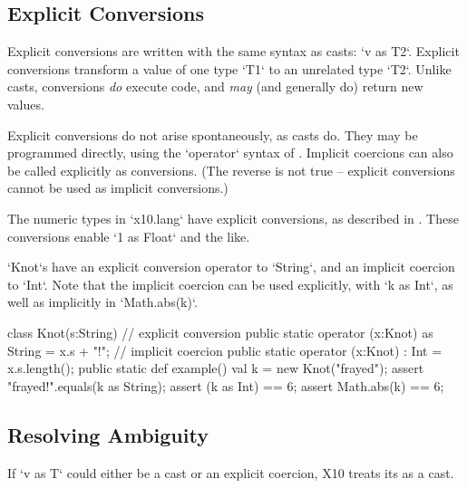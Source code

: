 \subsection{Explicit Conversions}

Explicit conversions are written with the same syntax as casts: \xcd`v as T2`.  
Explicit conversions transform a value of one type \xcd`T1` to an unrelated
type \xcd`T2`.  Unlike casts, conversions {\em do} execute code, and {\em may}
(and generally do) return new values.  

Explicit conversions do not arise spontaneously, as casts do. They may be
programmed directly, using the \xcd`operator` syntax of .  
Implicit coercions can also be called explicitly as conversions.  (The reverse
is not true -- explicit conversions cannot be used as implicit conversions.) 

The numeric types in \xcd`x10.lang` have explicit conversions, as described in
.  These conversions enable 
\xcd`1 as Float` and the like.  

\begin{ex}
\xcd`Knot`s have an explicit conversion operator to \xcd`String`, and an
implicit coercion to \xcd`Int`.  Note that the implicit coercion can be used
explicitly, with \xcd`k as Int`, as well as implicitly in \xcd`Math.abs(k)`. 
\begin{xten}
class Knot(s:String) { 
  // explicit conversion
  public static operator (x:Knot) as String = x.s + "!";
  // implicit coercion
  public static operator (x:Knot) : Int = x.s.length();
  public static def example() {
     val k = new Knot("frayed");
     assert "frayed!".equals(k as String);
     assert (k as Int) == 6;
     assert Math.abs(k) == 6; 
  }
}
\end{xten}

\end{ex}




\subsection{Resolving Ambiguity}
\label{sect:ambig-cast}

If \xcd`v as T` could either be a cast or an explicit coercion, X10 treats its
as a cast.  


